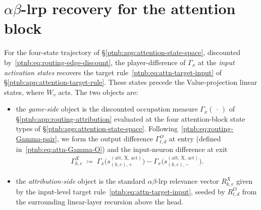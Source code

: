 \section{\texorpdfstring{$\alpha\beta$-\ac{lrp}}{alpha-beta-LRP} recovery for the attention block}\label{ptnb:app:attention-recovery}

For the four-state trajectory of \S\ref{ptnb:app:attention-state-space}, discounted
by~\eqref{ptnb:eq:routing-edge-discount}, the player-difference of $\Gamma_x$ at the
\emph{input activation states} recovers the target rule~\eqref{ptnb:eq:attn-target-input} of
\S\ref{ptnb:app:attention-target-rule}. These states precede the Value-projection linear states,
where $W_v$ acts. The two objects are:
\begin{itemize}
    \item the \emph{game-side} object is the discounted occupation measure $\Gamma_x(\,\cdot\,)$ of
        \S\ref{ptnb:app:routing-attribution} evaluated at the four attention-block state types of
        \S\ref{ptnb:app:attention-state-space}. Following~\eqref{ptnb:eq:routing-Gamma-pair}, we form the output difference
        $\Gamma^{O}_{t,d}$ at entry (defined in~\eqref{ptnb:eq:attn-Gamma-O})
        and the input-neuron difference at exit
        \begin{align}\label{ptnb:eq:attn-Gamma-X}
            \Gamma^{X}_{k,e} \;\coloneqq\;
            \Gamma_x\!\bigl(s_{(k,e),+}^{(\mathrm{att},\,\mathrm{X},\,\mathrm{act})}\bigr) -
            \Gamma_x\!\bigl(s_{(k,e),-}^{(\mathrm{att},\,\mathrm{X},\,\mathrm{act})}\bigr).
        \end{align}
    \item the \emph{attribution-side} object is the standard $\alpha\beta$-\ac{lrp} relevance vector
        $R^{X}_{k,e}$ given by the input-level target rule~\eqref{ptnb:eq:attn-target-input}, seeded by
        $R^{O}_{t,d}$ from the surrounding linear-layer recursion above the head.
\end{itemize}

